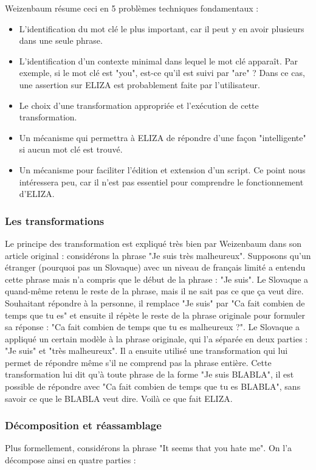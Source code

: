 \documentclass[11pt,a4paper]{report}
\begin{document}
Weizenbaum résume ceci en 5 problèmes techniques fondamentaux :
\begin{itemize}
  \item L'identification du mot clé le plus important, car il peut y en avoir plusieurs dans une 
  seule phrase.
  \item L'identification d'un contexte minimal dans lequel le mot clé apparaît. Par exemple, si le 
  mot clé est "you", est-ce qu'il est suivi par "are" ? Dans ce cas, une assertion sur ELIZA est 
  probablement faite par l'utilisateur.
  \item Le choix d'une transformation appropriée et l'exécution de cette transformation. 
  \item Un mécanisme qui permettra à ELIZA de répondre d'une façon "intelligente" si aucun mot 
  clé est trouvé. 
  \item Un mécanisme pour faciliter l'édition et extension d'un script. Ce point nous intéressera peu, 
  car il n'est pas essentiel pour comprendre le fonctionnement d'ELIZA. 
\end{itemize}

      \subsubsection*{Les transformations}
Le principe des transformation est expliqué très bien par Weizenbaum dans son article original : 
considérons la phrase "Je suis très malheureux". Supposons qu'un étranger (pourquoi pas un Slovaque) avec un niveau de 
français limité a entendu cette phrase mais n'a compris que le début de la phrase : "Je suis". 
Le Slovaque a quand-même retenu le reste de la phrase, mais il ne sait pas ce que ça veut dire. 
Souhaitant répondre à la personne, il remplace "Je suis" par "Ca fait combien de temps que tu es"
et ensuite il répète le reste de la phrase originale pour formuler sa réponse :
"Ca fait combien de temps que tu es malheureux ?". Le Slovaque a appliqué un certain modèle
à la phrase originale, qui l'a séparée en deux parties : "Je suis" et "très malheureux".
Il a ensuite utilisé une transformation qui lui permet de répondre même s'il ne comprend pas 
la phrase entière. Cette transformation lui dit qu'à toute phrase de la forme 
"Je suis BLABLA", il est possible de répondre avec "Ca fait combien de temps que tu es BLABLA", 
sans savoir ce que le BLABLA veut dire. Voilà ce que fait ELIZA.  

      \subsubsection*{Décomposition et réassamblage}
Plus formellement, considérons la phrase "It seems that you hate me". On l'a décompose ainsi
en quatre parties :
\end{document}
